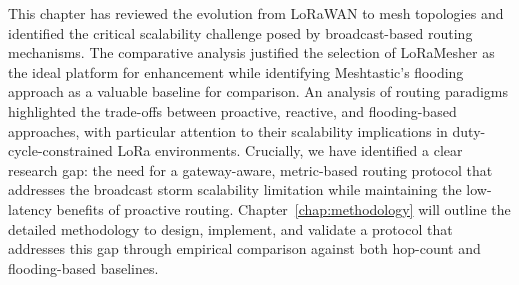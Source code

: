 This chapter has reviewed the evolution from LoRaWAN to mesh topologies and identified the critical scalability challenge posed by broadcast-based routing mechanisms. The comparative analysis justified the selection of LoRaMesher as the ideal platform for enhancement while identifying Meshtastic's flooding approach as a valuable baseline for comparison. An analysis of routing paradigms highlighted the trade-offs between proactive, reactive, and flooding-based approaches, with particular attention to their scalability implications in duty-cycle-constrained LoRa environments. Crucially, we have identified a clear research gap: the need for a gateway-aware, metric-based routing protocol that addresses the broadcast storm scalability limitation while maintaining the low-latency benefits of proactive routing. Chapter~\ref{chap:methodology} will outline the detailed methodology to design, implement, and validate a protocol that addresses this gap through empirical comparison against both hop-count and flooding-based baselines.
